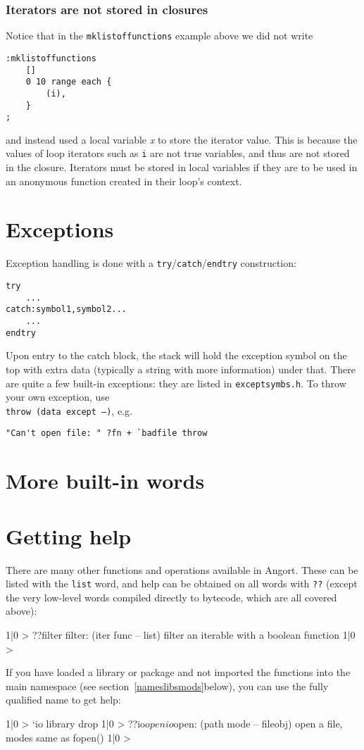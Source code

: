 \subsubsection{Iterators are not stored in closures}
Notice that in the \texttt{mklistoffunctions} example above we did not write
\begin{lstlisting}
:mklistoffunctions
    []
    0 10 range each {
        (i),
    }
;
\end{lstlisting}
and instead used a local variable \emph{x} to store the iterator value. This is because
the values of loop iterators such as \texttt{i} are not true variables, and thus are not
stored in the closure. Iterators must be stored in local variables if they are to be used
in an anonymous function created in their loop's context.

\section{Exceptions}
Exception handling is done with a \texttt{try}/\texttt{catch}/\texttt{endtry} 
construction:
\begin{lstlisting}
try
    ...
catch:symbol1,symbol2...
    ...
endtry
\end{lstlisting}
Upon entry to the catch block, the stack will hold the exception symbol
on the top with extra data (typically a string with more information)
under that. There are quite a few built-in exceptions: they are listed
in \texttt{exceptsymbs.h}. To throw your own exception, use \\
\texttt{throw (data except --)}, e.g.
\begin{lstlisting}
"Can't open file: " ?fn + `badfile throw 
\end{lstlisting}


\section{More built-in words}


\section{Getting help}
There are many other functions and operations available in Angort.
These can be listed with the \texttt{list} word, and help can
be obtained on all words with \texttt{??} (except the very low-level words compiled
directly to bytecode, which are all covered above):
\begin{v}
1|0 > ??filter
filter: (iter func -- list) filter an iterable with a boolean function
1|0 > 
\end{v}
If you have loaded a library or package and not imported the functions
into the main namespace (see section~\ref{nameslibsmods}below), you
can use the fully qualified name to get help:
\begin{v}
1|0 > `io library drop
1|0 > ??io$open
io$open: (path mode -- fileobj) open a file, modes same as fopen()
1|0 > 
\end{v}

